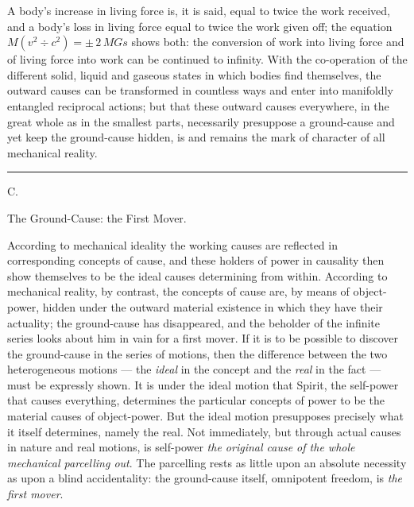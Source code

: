 \documentclass[12pt,a4paper]{book}
\newcommand{\afdeling}[2]{%
  \par\vspace{1.3\baselineskip}%
  {\centering #1\par\vspace{0.2\baselineskip}\normalsize #2\par}%
  \addcontentsline{toc}{section}{#1 #2}%
  \vspace{0.8\baselineskip}\par\nointerlineskip}
\newcommand{\streg}{\begin{center}\rule{2cm}{0.4pt}\end{center}}
\begin{document}
A body's increase in living force is, it is said, equal to twice the work received, and a body's
loss in living force equal to twice the work given off; the equation
$M(v^{2} \div c^{2}) = \pm\, 2\,MGs$ shows both: the conversion of work into living force and of
living force into work can be continued to infinity. With the co-operation of the different
solid, liquid and gaseous states in which bodies find themselves, the outward causes can be
transformed in countless ways and enter into manifoldly entangled reciprocal actions; but that
these outward causes everywhere, in the great whole as in the smallest parts, necessarily
presuppose a ground-cause and yet keep the ground-cause hidden, is and remains the mark of
character of all mechanical reality.

\streg

\afdeling{C.}{The Ground-Cause: the First Mover.}

According to mechanical ideality the working causes are reflected in corresponding concepts of
cause, and these
holders of power in causality then show themselves to be the ideal causes determining from
within. According to mechanical reality, by contrast, the concepts of cause are, by means of
object-power, hidden under the outward material existence in which they have their actuality; the
ground-cause has disappeared, and the beholder of the infinite series looks about him in vain for
a first mover. If it is to be possible to discover the ground-cause in the series of motions,
then the difference between the two heterogeneous motions --- the \emph{ideal} in the concept and
the \emph{real} in the fact --- must be expressly shown. It is under the ideal motion that
Spirit, the self-power that causes everything, determines the particular concepts of power to be
the material causes of object-power. But the ideal motion presupposes precisely what it itself
determines, namely the real. Not immediately, but through actual causes in nature and real
motions, is self-power \emph{the original cause of the whole mechanical parcelling out}. The
parcelling rests as little upon an absolute necessity as upon a blind accidentality: the
ground-cause itself, omnipotent freedom, is \emph{the first mover}.
\end{document}
